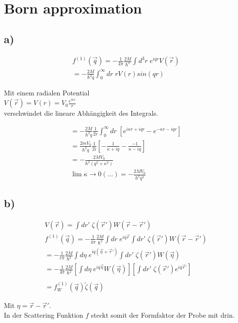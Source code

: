 \section{Born approximation}

\subsection{a)}

\begin{align}
f^{\left(1\right)} \left(\vec{q}\right) = - \frac{1}{4\pi} \frac{2M}{\hbar^2}
\int d^3r \; e^{iqr} V\left(\vec{r}\right) \\
= - \frac{2M}{\hbar^2q} \int_0^{\infty} dr \; rV\left(r\right)
sin\left(qr\right)
\end{align}

Mit einem radialen Potential \\
$V\left( \vec{r} \right)= V\left(r\right) = V_0
\frac{e^{i\kappa r}}{r}$ \\

verschwindet die lineare Abh\"angigkeit des
Integrals.

\begin{align}
= - \frac{2M}{\hbar^2 q} \frac{1}{2r} \int_0^{\infty} dr \; \left[ e^{i\kappa r
+iqr}-e^{-\kappa r -iqr} \right] \\
= \frac{2m V_0}{\hbar^2q} \frac{1}{2i} \left[
-\frac{1}{\kappa+iq}-\frac{-1}{\kappa-iq} \right] \\
= - \frac{2MV_0}{\hbar^2\left(q^2+\kappa^2\right)} \\
\lim\limits{\kappa \rightarrow 0} \left(\ldots\right) = - \frac{2MV_0}{\hbar^2
q^2}
\end{align}

\subsection{b)}

\begin{align}
V\left(\vec{r}\right) = \int dr' \; \zeta \left(\vec{r}'\right)
W\left(\vec{r}-\vec{r}'\right) \\
f^{\left(1\right)} \left(\vec{q}\right) = - \frac{1}{4\pi} \frac{2M}{\hbar^2}
\int dr \; e^{iq\vec{r}} \int dr' \; \zeta \left(\vec{r}'\right)
W\left(\vec{r}-\vec{r}'\right) \\
= -\frac{1}{e\pi} \frac{2M}{\hbar^2} \int d\eta \; e^{iq
\left(\vec{\eta}+\vec{r}' \right)} \int dr' \; \zeta \left(\vec{r}'\right)
W\left(\vec{\eta}\right) \\
= -\frac{1}{4\pi} \frac{2M}{\hbar^2} \left[ \int d\eta \; e^{iq\vec{\eta}}
W\left(\vec{\eta}\right) \right] \left[ \int dr' \; \zeta \left(\vec{r}'\right)
e^{iq\vec{r}'} \right] \\
\\
= f_W^{\left(1\right)} \left(\vec{q}\right) \tilde{\zeta}
\left(\vec{q}\right)
\end{align}

Mit $\eta = \vec{r}-\vec{r}'$.\\
In der Scattering Funktion $f$ steckt somit der Formfaktor der Probe mit drin.